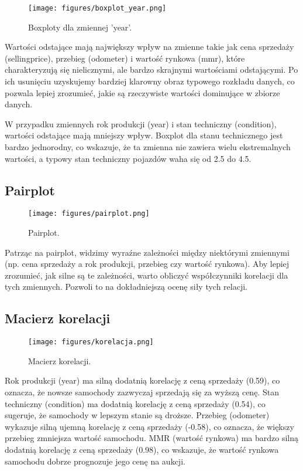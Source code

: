 \documentclass[10pt,letterpaper]{article}
\begin{document}
\begin{figure}[H]
\begin{center}
   \texttt{[image: figures/boxplot\_year.png]}
   \caption{Boxploty dla zmiennej 'year'.}
   \label{fig:other-figure-log}
\end{center}
\end{figure}

Wartości odstające mają największy wpływ na zmienne takie jak cena sprzedaży (sellingprice), przebieg (odometer) i wartość rynkowa (mmr), które charakteryzują się nielicznymi, ale bardzo skrajnymi wartościami odstającymi. Po ich usunięciu uzyskujemy bardziej klarowny obraz typowego rozkładu danych, co pozwala lepiej zrozumieć, jakie są rzeczywiste wartości dominujące w zbiorze danych.

W przypadku zmiennych rok produkcji (year) i stan techniczny (condition), wartości odstające mają mniejszy wpływ. Boxplot dla stanu technicznego jest bardzo jednorodny, co wskazuje, że ta zmienna nie zawiera wielu ekstremalnych wartości, a typowy stan techniczny pojazdów waha się od 2.5 do 4.5.

\subsection{Pairplot}
\begin{figure}[H]
\begin{center}
   \texttt{[image: figures/pairplot.png]}
   \caption{Pairplot.}
   \label{fig:other-figure-log}
\end{center}
\end{figure}
Patrząc na pairplot, widzimy wyraźne zależności między niektórymi zmiennymi (np. cena sprzedaży a rok produkcji, przebieg czy wartość rynkowa). Aby lepiej zrozumieć, jak silne są te zależności, warto obliczyć współczynniki korelacji dla tych zmiennych. Pozwoli to na dokładniejszą ocenę siły tych relacji.

\subsection{Macierz korelacji}
\begin{figure}[H]
\begin{center}
   \texttt{[image: figures/korelacja.png]}
   \caption{Macierz korelacji.}
   \label{fig:other-figure-log}
\end{center}
\end{figure}
Rok produkcji (year) ma silną dodatnią korelację z ceną sprzedaży (0.59), co oznacza, że nowsze samochody zazwyczaj sprzedają się za wyższą cenę. Stan techniczny (condition) ma dodatnią korelację z ceną sprzedaży (0.54), co sugeruje, że samochody w lepszym stanie są droższe. Przebieg (odometer) wykazuje silną ujemną korelację z ceną sprzedaży (-0.58), co oznacza, że większy przebieg zmniejsza wartość samochodu. MMR (wartość rynkowa) ma bardzo silną dodatnią korelację z ceną sprzedaży (0.98), co wskazuje, że wartość rynkowa samochodu dobrze prognozuje jego cenę na aukcji.
\end{document}
